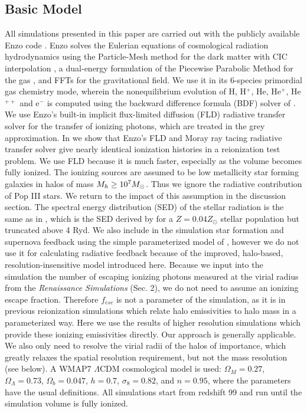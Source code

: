 \documentclass[iop,apj]{emulateapj}
\begin{document}
\subsection{Basic Model}\label{method}
All simulations presented in this paper are carried out with the publicly available Enzo code \citep{Enzo}. Enzo solves the Eulerian equations of cosmological radiation hydrodynamics using the Particle-Mesh method for the dark matter with CIC interpolation \citep{HockneyEastwood88},  a dual-energy formulation of the Piecewise Parabolic Method for the gas \citep{Bryan95}, and FFTs for the gravitational field. We use it in its 6-species primordial gas chemistry mode, wherein the nonequilibrium evolution of H, H$^+$, He, He$^+$, He$^{++}$ and e$^-$ is computed using the backward difference formula (BDF) solver of \cite{Anninos97}.  We use Enzo's built-in implicit flux-limited diffusion (FLD) radiative transfer solver \citep{ReynoldsEtAl2009,Norman13} for the transfer of ionizing photons, which are treated in the grey approximation. In \cite{Norman13} we show that Enzo's FLD and Moray ray tacing radiative transfer solver \citep{Wise11_Moray} give nearly identical ionization histories in a reionization test problem.  We use FLD because it is much faster, especially as the volume becomes fully ionized. The ionizing sources are assumed to be low metallicity star forming galaxies in halos of mass $\mh \geq 10^7\Ms$. Thus we ignore the radiative contribution of Pop III stars. We return to the impact of this assumption in the discussion section. The spectral energy distribution (SED) of the stellar radiation is the same as in \cite{So14}, which is the SED derived by \cite{Ricotti02} for a $Z=0.04 Z_{\odot}$ stellar population but truncated above 4 Ryd.  We also include in the simulation star formation and supernova feedback using the simple parameterized model of \cite{So14}, however we do not use it for calculating radiative feedback because of the improved, halo-based, resolution-insensitive model introduced here. Because we input into the simulation the number of escaping ionizing photons measured at the virial radius from the {\it Renaissance Simulations} (Sec. 2), we do not need to assume an ionizing escape fraction. Therefore $f_{esc}$ is not a parameter of the simulation, as it is in previous reionization simulations which relate halo emissivities to halo mass in a parameterized way. Here we use the results of higher resolution simulations which provide these ionizing emissivities directly. Our approach is generally applicable. We also only need to resolve the virial radii of the halos of importance, which greatly relaxes the spatial resolution requirement, but not the mass resolution (see below).  A WMAP7 $\Lambda$CDM cosmological model is used: $\Omega_M=0.27$, $\Omega_\Lambda=0.73$, $\Omega_b=0.047$, $h=0.7$, $\sigma_8=0.82$, and $n=0.95$, where the parameters have the usual
definitions. All simulations start from redshift 99 and run until the simulation volume is fully ionized. 
\end{document}
